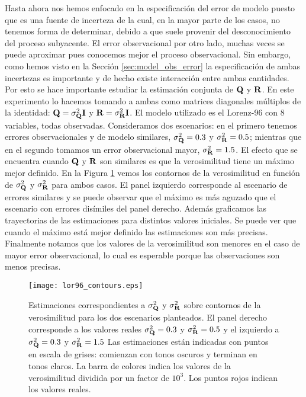 Hasta ahora nos hemos enfocado en la especificación del error de modelo puesto que es una fuente de incerteza de la cual, en la mayor parte de los casos, no tenemos forma de determinar, debido a que suele provenir del desconocimiento del proceso subyacente. El error observacional por otro lado, muchas veces se puede aproximar pues conocemos mejor el proceso observacional. Sin embargo, como hemos visto en la Sección \ref{sec:model_obs_error} la especificación de ambas incertezas es importante y de hecho existe interacción entre ambas cantidades. Por esto se hace importante estudiar la estimación conjunta de $\mathbf{Q}$ y $\mathbf{R}$. En este experimento lo hacemos tomando a ambas como matrices diagonales múltiplos de la identidad: $\mathbf{Q} = \sigma_{\mathbf{Q}}^2 \mathbf{I}$ y $\mathbf{R} = \sigma_{\mathbf{R}}^2 \mathbf{I}$. El modelo utilizado es el Lorenz-96 con 8 variables, todas observadas. Consideramos dos escenarios: en el primero tenemos errores observacionales y de modelo similares, $\sigma_{\mathbf{Q}}^2 = 0.3$ y $\sigma_{\mathbf{R}}^2 = 0.5$; mientras que en el segundo tomamos un error observacional mayor, $\sigma_{\mathbf{R}}^2 = 1.5$. El efecto que se encuentra cuando $\mathbf{Q}$ y $\mathbf{R}$ son similares es que la verosimilitud tiene un máximo mejor definido. En la Figura \ref{fig:lor96_contours} vemos los contornos de la verosimilitud en función de $\sigma_{\mathbf{Q}}^2$ y $\sigma_{\mathbf{R}}^2$ para ambos casos. El panel izquierdo corresponde al escenario de errores similares y se puede observar que el máximo es más aguzado que el escenario con errores disímiles del panel derecho. Además graficamos las trayectorias de las estimaciones para distintos valores iniciales. Se puede ver que cuando el máximo está mejor definido las estimaciones son más precisas. Finalmente notamos que los valores de la verosimilitud son menores en el caso de mayor error observacional, lo cual es esperable porque las observaciones son menos precisas.

\begin{figure}[h]
    \centering
    \texttt{[image: lor96\_contours.eps]}
    \caption{Estimaciones correspondientes a $\sigma_{\mathbf{Q}}^2$ y $\sigma_{\mathbf{R}}^2$ sobre contornos de la verosimilitud para los dos escenarios planteados. El panel derecho corresponde a los valores reales $\sigma_{\mathbf{Q}}^2 = 0.3$ y $\sigma_{\mathbf{R}}^2 = 0.5$ y el izquierdo a $\sigma_{\mathbf{Q}}^2 = 0.3$ y $\sigma_{\mathbf{R}}^2 = 1.5$ Las estimaciones están indicadas con puntos en escala de grises: comienzan con tonos oscuros y terminan en tonos claros. La barra de colores indica los valores de la verosimilitud dividida por un factor de $10^3$. Los puntos rojos indican los valores reales.}
    \label{fig:lor96_contours}
\end{figure}

